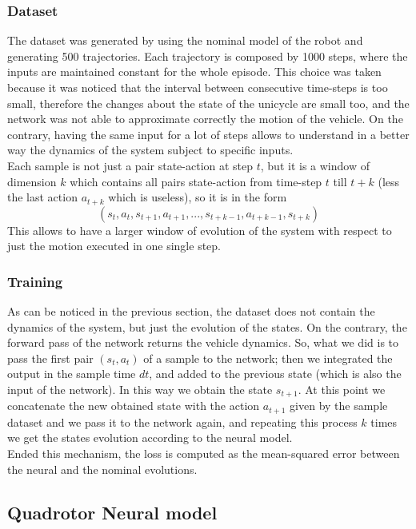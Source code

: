 \subsubsection{Dataset}
The dataset was generated by using the nominal model of the robot and generating 500 trajectories.
Each trajectory is composed by 1000 steps, where the inputs are maintained constant for the whole episode.
This choice was taken because it was noticed that the interval between
consecutive time-steps is too small, therefore the changes about the state of the unicycle are small too, and 
the network was not able to approximate correctly the motion of the vehicle. On the contrary, having the same
input for a lot of steps allows to understand in a better way the dynamics of the system subject to specific 
inputs. \\
Each sample is not just a pair state-action at step $t$, but it is a window of dimension $k$ which contains
all pairs state-action from time-step $t$ till $t+k$ (less the last action $a_{t+k}$ which is useless), 
so it is in the form 
\begin{equation}
    (s_t, a_t, s_{t+1}, a_{t+1}, ..., s_{t+k-1}, a_{t+k-1}, s_{t+k})
\end{equation}
This allows to have a larger window of evolution of the system with respect to just the motion executed in
one single step. 


\subsubsection{Training}

As can be noticed in the previous section, the dataset does not contain the dynamics of the system, 
but just the evolution of the states. On the contrary, the forward pass of the network returns
the vehicle dynamics. So, what we did is to pass the first pair $(s_t, a_t)$ of a sample to the 
network; then we integrated the output in the sample time $dt$, 
and added to the previous state (which is also the input of the network).
In this way we obtain the state $s_{t+1}$.
At this point we concatenate the new obtained state with the action $a_{t+1}$ given by the sample dataset
and we pass it to the network again, and repeating
this process $k$ times we get the states evolution according to the neural model. \\
Ended this mechanism, the loss is computed as the mean-squared error between the neural and the nominal evolutions. 


\subsection{Quadrotor Neural model}